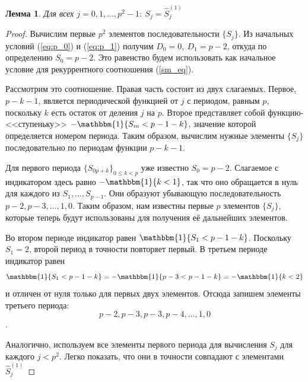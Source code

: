 \documentclass[14pt, a4paper, russian]{report}
\newtheorem{lemma}{\indent Лемма}
\begin{document}
\begin{lemma}\label{sm1}
Для всех $j = 0, 1, \ldots, p^2-1:\ S_j=\hat{S}_j^{(1)}$
\end{lemma}
\begin{proof}
Вычислим первые $p^2$ элементов последовательности $\{S_j\}$. Из начальных условий (\ref{eq:p_0}) и (\ref{eq:p_1}) получим $D_0 = 0,\ D_1 = p-2$, откуда по определению $S_0 = p-2$. Это равенство будем использовать как начальное условие для рекуррентного соотношения (\ref{sm_eq}).

Рассмотрим это соотношение. Правая часть состоит из двух слагаемых. Первое, $p-k-1$, является периодической функцией от $j$ с периодом, равным $p$, поскольку $k$ есть остаток от деления $j$ на $p$. Второе представляет собой функцию-<<ступеньку>> $-\mathbbm{1}\{S_m < p-1-k\}$, значение которой определяется номером периода. Таким образом, вычислим нужные элементы $\{S_j\}$ последовательно по периодам функции $p-k-1$.

Для первого периода $\{S_{0p+k}\}_{0 \le k < p}$ уже известно $S_0=p-2$. Слагаемое с индикатором здесь равно $-\mathbbm{1}\{k < 1\}$, так что оно обращается в нуль для каждого из $S_1, \ldots, S_{p-1}$. Они образуют убывающую последовательность $p-2, p-3, \ldots, 1, 0$. Таким образом, нам известны первые $p$ элементов $\{S_j\}$, которые теперь будут использованы для получения её дальнейших элементов.

Во втором периоде индикатор равен $\mathbbm{1}\{S_1 < p-1-k\}$. Поскольку $S_1=2$, второй период в точности повторяет первый. В третьем периоде индикатор равен $$\mathbbm{1}\{S_1 < p-1-k\}=-\mathbbm{1}\{p-3 < p-1-k\} = -\mathbbm{1}\{k < 2\}$$ и отличен от нуля только для первых двух элементов. Отсюда запишем элементы третьего периода: $$p-2,p-3,p-3,p-4, \ldots, 1, 0$$.

Аналогично, используем все элементы первого периода для вычисления $S_j$ для каждого $j < p^2$. 
Легко показать, что они в точности совпадают с элементами $\hat{S}_j^{(1)}$
\end{proof}
\end{document}
